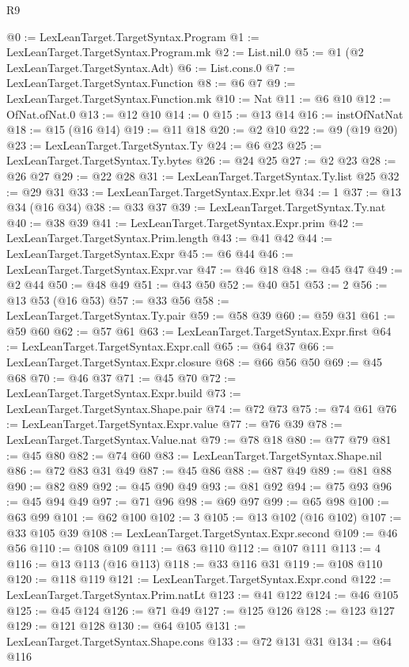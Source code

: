 \begin{lexlean}{R9}
\begin{coremodule}
{{{{{{{{{{{{{{{{{{{{{@0 := LexLeanTarget.TargetSyntax.Program
@1 := LexLeanTarget.TargetSyntax.Program.mk
@2 := List.nil.{0}
@5 := @1 (@2 LexLeanTarget.TargetSyntax.Adt)
@6 := List.cons.{0}
@7 := LexLeanTarget.TargetSyntax.Function
@8 := @6 @7
@9 := LexLeanTarget.TargetSyntax.Function.mk
@10 := Nat
@11 := @6 @10
@12 := OfNat.ofNat.{0}
@13 := @12 @10
@14 := 0
@15 := @13 @14
@16 := instOfNatNat
@18 := @15 (@16 @14)
@19 := @11 @18
@20 := @2 @10
@22 := @9 (@19 @20)
@23 := LexLeanTarget.TargetSyntax.Ty
@24 := @6 @23
@25 := LexLeanTarget.TargetSyntax.Ty.bytes
@26 := @24 @25
@27 := @2 @23
@28 := @26 @27
@29 := @22 @28
@31 := LexLeanTarget.TargetSyntax.Ty.list @25
@32 := @29 @31
@33 := LexLeanTarget.TargetSyntax.Expr.let
@34 := 1
@37 := @13 @34 (@16 @34)
@38 := @33 @37
@39 := LexLeanTarget.TargetSyntax.Ty.nat
@40 := @38 @39
@41 := LexLeanTarget.TargetSyntax.Expr.prim
@42 := LexLeanTarget.TargetSyntax.Prim.length
@43 := @41 @42
@44 := LexLeanTarget.TargetSyntax.Expr
@45 := @6 @44
@46 := LexLeanTarget.TargetSyntax.Expr.var
@47 := @46 @18
@48 := @45 @47
@49 := @2 @44
@50 := @48 @49
@51 := @43 @50
@52 := @40 @51
@53 := 2
@56 := @13 @53 (@16 @53)
@57 := @33 @56
@58 := LexLeanTarget.TargetSyntax.Ty.pair
@59 := @58 @39
@60 := @59 @31
@61 := @59 @60
@62 := @57 @61
@63 := LexLeanTarget.TargetSyntax.Expr.first
@64 := LexLeanTarget.TargetSyntax.Expr.call
@65 := @64 @37
@66 := LexLeanTarget.TargetSyntax.Expr.closure
@68 := @66 @56 @50
@69 := @45 @68
@70 := @46 @37
@71 := @45 @70
@72 := LexLeanTarget.TargetSyntax.Expr.build
@73 := LexLeanTarget.TargetSyntax.Shape.pair
@74 := @72 @73
@75 := @74 @61
@76 := LexLeanTarget.TargetSyntax.Expr.value
@77 := @76 @39
@78 := LexLeanTarget.TargetSyntax.Value.nat
@79 := @78 @18
@80 := @77 @79
@81 := @45 @80
@82 := @74 @60
@83 := LexLeanTarget.TargetSyntax.Shape.nil
@86 := @72 @83 @31 @49
@87 := @45 @86
@88 := @87 @49
@89 := @81 @88
@90 := @82 @89
@92 := @45 @90 @49
@93 := @81 @92
@94 := @75 @93
@96 := @45 @94 @49
@97 := @71 @96
@98 := @69 @97
@99 := @65 @98
@100 := @63 @99
@101 := @62 @100
@102 := 3
@105 := @13 @102 (@16 @102)
@107 := @33 @105 @39
@108 := LexLeanTarget.TargetSyntax.Expr.second
@109 := @46 @56
@110 := @108 @109
@111 := @63 @110
@112 := @107 @111
@113 := 4
@116 := @13 @113 (@16 @113)
@118 := @33 @116 @31
@119 := @108 @110
@120 := @118 @119
@121 := LexLeanTarget.TargetSyntax.Expr.cond
@122 := LexLeanTarget.TargetSyntax.Prim.natLt
@123 := @41 @122
@124 := @46 @105
@125 := @45 @124
@126 := @71 @49
@127 := @125 @126
@128 := @123 @127
@129 := @121 @128
@130 := @64 @105
@131 := LexLeanTarget.TargetSyntax.Shape.cons
@133 := @72 @131 @31
@134 := @64 @116
}}}}}}}}}}}}}}}}}}}}}
\end{coremodule}
\end{lexlean}
